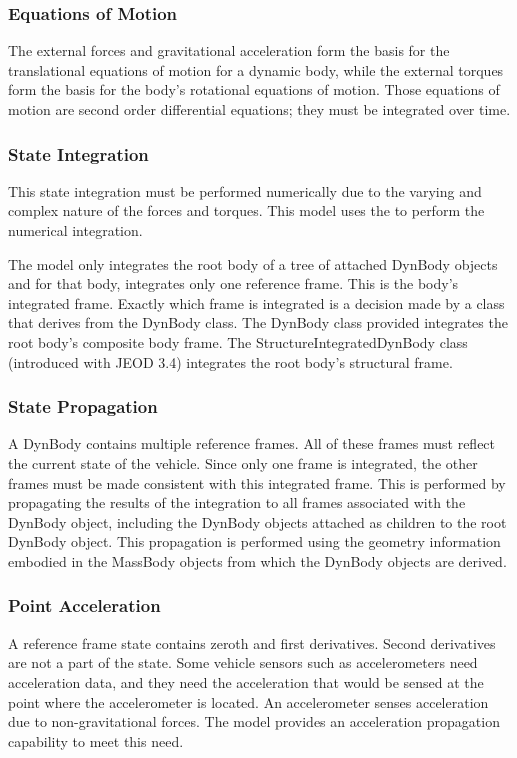\subsubsection{Equations of Motion}\label{sec:key_eom}
The external forces and gravitational acceleration form the basis for the
translational equations of motion for a dynamic body, while the external torques
form the basis for the body's rotational equations of motion. Those equations
of motion are second order differential equations; they must be integrated over
time.

\subsubsection{State Integration}\label{sec:key_state_integ}
This state integration must be performed numerically due to the varying and complex nature of the forces and torques. This model uses the \INTEGRATION to
perform the numerical integration.

The model only integrates the root body of a tree of attached DynBody objects
and for that body, integrates only one reference frame. This is the body's
integrated frame. Exactly which frame is integrated is a decision made by a
class that derives from the DynBody class. The DynBody class provided integrates the root body's composite body frame.
The StructureIntegratedDynBody class (introduced with JEOD 3.4) integrates the
root body's structural frame.

\subsubsection{State Propagation}\label{sec:key_state_prop}
A DynBody contains multiple reference frames. All of these frames must reflect
the current state of the vehicle. Since only one frame is integrated, the other
frames must be made consistent with this integrated frame. This is performed
by propagating the results of the integration to all frames associated
with the DynBody object, including the DynBody objects attached as children
to the root DynBody object. This propagation is performed using the geometry
information embodied in the MassBody objects from which the DynBody objects
are derived.

\subsubsection{Point Acceleration}
A reference frame state contains zeroth and first derivatives. Second
derivatives are not a part of the state. Some vehicle sensors such as
accelerometers need acceleration data, and they need the acceleration that
would be sensed at the point where the accelerometer is located.
An accelerometer senses acceleration due to non-gravitational forces.
The model provides an acceleration propagation capability to meet this
need.
